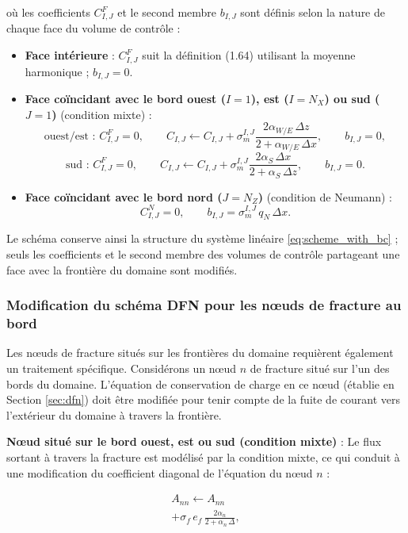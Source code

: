 où les coefficients $C_{I,J}^F$ et le second membre $b_{I,J}$ sont définis selon la nature de chaque face du volume de contrôle :

\begin{itemize}[label = \textbullet]
    \item \textbf{Face intérieure} : $C_{I,J}^F$ suit la définition (1.64) utilisant la moyenne harmonique ; $b_{I,J}=0$.
    
    \item \textbf{Face coïncidant avec le bord ouest ($I=1$), est ($I=N_X$) ou sud ($J=1$)} (condition mixte) : 
    $$\text{ouest/est : } C_{I,J}^F=0, \qquad C_{I,J}\leftarrow C_{I,J}+\sigma_m^{I,J}\frac{2\alpha_{W/E}\,\Delta z}{2+\alpha_{W/E}\,\Delta x}, \qquad b_{I,J}=0,$$
    $$\text{sud : } C_{I,J}^F=0, \qquad C_{I,J}\leftarrow C_{I,J}+\sigma_m^{I,J}\frac{2\alpha_{S}\,\Delta x}{2+\alpha_{S}\,\Delta z}, \qquad b_{I,J}=0.$$
    
    \item \textbf{Face coïncidant avec le bord nord ($J=N_Z$)} (condition de Neumann) : 
    $$C_{I,J}^N=0, \qquad b_{I,J}=\sigma_m^{I,J}\,q_N\,\Delta x.$$
\end{itemize}

Le schéma conserve ainsi la structure du système linéaire \eqref{eq:scheme_with_bc} ; seuls les coefficients et le second membre des volumes de contrôle partageant une face avec la frontière du domaine sont modifiés.

\subsubsection{Modification du schéma DFN pour les nœuds de fracture au bord}

Les nœuds de fracture situés sur les frontières du domaine requièrent également un traitement spécifique. Considérons un nœud $n$ de fracture situé sur l'un des bords du domaine. L'équation de conservation de charge en ce nœud (établie en Section \ref{sec:dfn}) doit être modifiée pour tenir compte de la fuite de courant vers l'extérieur du domaine à travers la frontière.

\textbf{Nœud situé sur le bord ouest, est ou sud (condition mixte)} : Le flux sortant à travers la fracture est modélisé par la condition mixte, ce qui conduit à une modification du coefficient diagonal de l'équation du nœud $n$ :

\begin{equation}
\begin{split}
A_{nn}\leftarrow A_{nn} \\
+\sigma_f\,e_f\,\frac{2\alpha_n}{2+\alpha_n\,\Delta},
\end{split}
\label{eq:fracture_diagonal_bc}
\end{equation}

